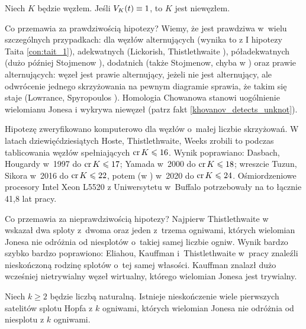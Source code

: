\begin{conjecture}
%
\label{con:jones}%
    Niech $K$ będzie węzłem.
    Jeśli $V_K(t) \equiv 1$, to $K$ jest niewęzłem.
\end{conjecture}

Co przemawia za prawdziwością hipotezy?
Wiemy, że jest prawdziwa w~wielu szczególnych przypadkach: dla węzłów alternujących (wynika to z I hipotezy Taita \ref{con:tait_1}), adekwatnych (Lickorish, Thistlethwaite \cite{lickorish1988}), póładekwatnych (dużo później Stojmenow \cite{stoimenow2011}), dodatnich (także Stojmenow, chyba w \cite{stoimenow2003}) oraz prawie alternujących: węzeł jest prawie alternujący, jeżeli nie jest alternujący, ale odwrócenie jednego skrzyżowania na pewnym diagramie sprawia, że takim się staje (Lowrance, Spyropoulos \cite{lowrance2017}).
%
%
%
%
%
%
%
%
%
%
Homologia Chowanowa stanowi uogólnienie wielomianu Jonesa i wykrywa niewęzeł (patrz fakt \ref{khovanov_detects_unknot}).
%

Hipotezę zweryfikowano komputerowo dla węzłów o~małej liczbie skrzyżowań.
W latach dziewięćdziesiątych Hoste, Thistlethwaite, Weeks \cite{thistlethwaite1998} zrobili to podczas tablicowania węzłów spełniających $\operatorname{cr} K \leqslant 16$.
%
%
%
Wynik poprawiano:
Dasbach, Hougardy \cite{hougardy1997} w~1997 do $\operatorname{cr} K \leqslant 17$; 
%
%
Yamada \cite{yamada1999} w~2000 do $\operatorname{cr} K \leqslant 18$;
%
wreszcie Tuzun, Sikora \cite{tuzun2018} w~2016 do $\operatorname{cr} K \leqslant 22$,
%
%
potem (w \cite{tuzun2021}) w~2020 do $\operatorname{cr} K \leqslant 24$.
Ośmiordzeniowe procesory Intel Xeon L5520 z Uniwersytetu w~Buffalo potrzebowały na to łącznie 41,8 lat pracy.

Co przemawia za nieprawdziwością hipotezy?
Najpierw Thistlethwaite w~\cite{thistlethwaite2001} wskazał dwa sploty z~dwoma oraz jeden z~trzema ogniwami, których wielomian Jonesa nie odróżnia od niesplotów o~takiej samej liczbie ogniw.
%
Wynik bardzo szybko bardzo poprawiono: Eliahou, Kauffman i~Thistlethwaite w~pracy \cite{eliahou2003} znaleźli nieskończoną rodzinę splotów o~tej samej własości.
%
%
Kauffman znalazł dużo wcześniej nietrywialny węzeł wirtualny, którego wielomian Jonesa jest trywialny.

\begin{proposition}
%
%
    Niech $k \ge 2$ będzie liczbą naturalną.
    Istnieje nieskończenie wiele pierwszych satelitów splotu Hopfa z $k$ ogniwami, których wielomian Jonesa nie odróżnia od niesplotu z $k$ ogniwami.
\end{proposition}

